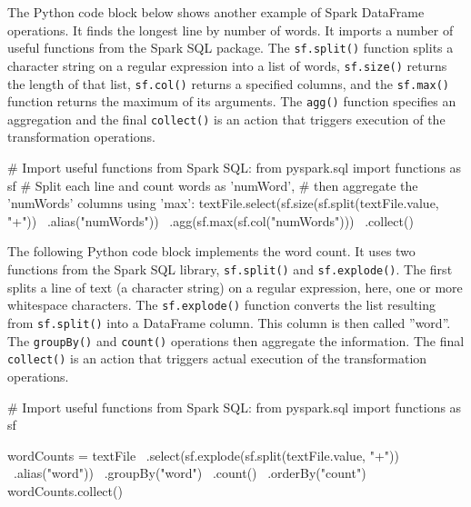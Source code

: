 \begin{withcode}
The Python code block below shows another example of Spark DataFrame operations. It finds the longest line by number of words. It imports a number of useful functions from the Spark SQL package. The \texttt{sf.split()} function splits a character string on a regular expression into a list of words, \texttt{sf.size()} returns the length of that list, \texttt{sf.col()} returns a specified columns, and the \texttt{sf.max()} function returns the maximum of its arguments. The \texttt{agg()} function specifies an aggregation and the final \texttt{collect()} is an action that triggers execution of the transformation operations.

\begin{pythoncode}
# Import useful functions from Spark SQL:
from pyspark.sql import functions as sf
# Split each line and count words as 'numWord', 
# then aggregate the 'numWords' columns using 'max':
textFile.select(sf.size(sf.split(textFile.value, "\s+")) \
    .alias("numWords")) \
    .agg(sf.max(sf.col("numWords"))) \
    .collect()
\end{pythoncode}

The following Python code block implements the word count. It uses two functions from the Spark SQL library, \texttt{sf.split()} and \texttt{sf.explode()}. The first splits a line of text (a character string) on a regular expression, here, one or more whitespace characters. The \texttt{sf.explode()} function converts the list resulting from \texttt{sf.split()} into a DataFrame column. This column is then called ''word''. The \texttt{groupBy()} and \texttt{count()} operations then aggregate the information. The final \texttt{collect()} is an action that triggers actual execution of the transformation operations.

\begin{pythoncode}
# Import useful functions from Spark SQL:
from pyspark.sql import functions as sf

wordCounts = textFile \
    .select(sf.explode(sf.split(textFile.value, "\s+")) \
    .alias("word")) \
    .groupBy("word") \
    .count() \
    .orderBy("count")
wordCounts.collect()
\end{pythoncode}
\end{withcode}

